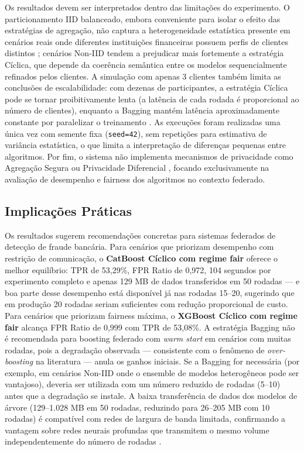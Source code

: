 Os resultados devem ser interpretados dentro das limitações do experimento. O particionamento IID balanceado, embora conveniente para isolar o efeito das estratégias de agregação, não captura a heterogeneidade estatística presente em cenários reais onde diferentes instituições financeiras possuem perfis de clientes distintos \cite{zhu2021noniid}; cenários Non-IID tendem a prejudicar mais fortemente a estratégia Cíclica, que depende da coerência semântica entre os modelos sequencialmente refinados pelos clientes. A simulação com apenas 3 clientes também limita as conclusões de escalabilidade: com dezenas de participantes, a estratégia Cíclica pode se tornar proibitivamente lenta (a latência de cada rodada é proporcional ao número de clientes), enquanto a Bagging mantém latência aproximadamente constante por paralelizar o treinamento \cite{bonawitz2019scale}. As execuções foram realizadas uma única vez com semente fixa (\texttt{seed=42}), sem repetições para estimativa de variância estatística, o que limita a interpretação de diferenças pequenas entre algoritmos. Por fim, o sistema não implementa mecanismos de privacidade como Agregação Segura \cite{bonawitz2017secagg} ou Privacidade Diferencial \cite{geyer2017differential}, focando exclusivamente na avaliação de desempenho e fairness dos algoritmos no contexto federado.

\subsection{Implicações Práticas}

Os resultados sugerem recomendações concretas para sistemas federados de detecção de fraude bancária. Para cenários que priorizam desempenho com restrição de comunicação, o \textbf{CatBoost Cíclico com regime fair} oferece o melhor equilíbrio: TPR de 53,29\%, FPR Ratio de 0,972, 104 segundos por experimento completo e apenas 129 MB de dados transferidos em 50 rodadas --- e boa parte desse desempenho está disponível já nas rodadas 15--20, sugerindo que em produção 20 rodadas seriam suficientes com redução proporcional de custo. Para cenários que priorizam fairness máxima, o \textbf{XGBoost Cíclico com regime fair} alcança FPR Ratio de 0,999 com TPR de 53,08\%. A estratégia Bagging não é recomendada para boosting federado com \textit{warm start} em cenários com muitas rodadas, pois a degradação observada --- consistente com o fenômeno de \textit{over-boosting} na literatura \cite{chen2016xgboost} --- anula os ganhos iniciais. Se a Bagging for necessária (por exemplo, em cenários Non-IID onde o ensemble de modelos heterogêneos pode ser vantajoso), deveria ser utilizada com um número reduzido de rodadas (5--10) antes que a degradação se instale. A baixa transferência de dados dos modelos de árvore (129--1.028 MB em 50 rodadas, reduzindo para 26--205 MB com 10 rodadas) é compatível com redes de largura de banda limitada, confirmando a vantagem sobre redes neurais profundas que transmitem o mesmo volume independentemente do número de rodadas \cite{konecny2016communication, liu2024survey}.
